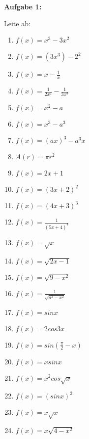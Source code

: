 \documentclass[a4paper,12pt]{article}
\newcommand{\Aufgabe}[1]{
  {
  \vspace*{0.5cm}
  \textsf{\textbf{Aufgabe #1}}
  \vspace*{0.2cm}
  
  }
}
\begin{document}
\Aufgabe{1:}
Leite ab:
\begin{enumerate}[label={\alph*)}, topsep=5pt,itemsep=4ex,partopsep=1ex,parsep=1ex]
  \item $f(x)=x^3-3x^2$
  \item $f(x)=(3x^3)-2^2$
  \item $f(x)=x-\frac{1}{x}$
  \item $f(x)=\frac{1}{2x^2}-\frac{1}{3x^3}$
  \item $f(x)=x^2-a$
  \item $f(x)=x^3-a^3$
  \item $f(x)=(ax)^3-a^3x$
  \item $A(r)=\pi r^2$
  \item $f(x)=2x+1$
  \item $f(x)=(3x+2)^2$
  \item $f(x)=(4x+3)^3$
  \item $f(x)=\frac{1}{(5x+4)^4}$
  \item $f(x)=\sqrt{x}$
  \item $f(x)=\sqrt{2x-1}$
  \item $f(x)=\sqrt{9-x^2}$
  \item $f(x)=\frac{1}{\sqrt{a^2-x^2}}$
  \item $f(x)=sin{x}$
  \item $f(x)=2 cos{3x}$
  \item $f(x)=sin{(\frac{\pi}{2}-x)}$
  \item $f(x)=x sin{x}$
  \item $f(x)=x^2 cos{\sqrt{x}}$
  \item $f(x)=(sin{x})^2$
  \item $f(x)=x\sqrt{x}$
  \item $f(x)=x\sqrt{4-x^2}$
\end{enumerate}

\vspace{1cm}
\end{document}
